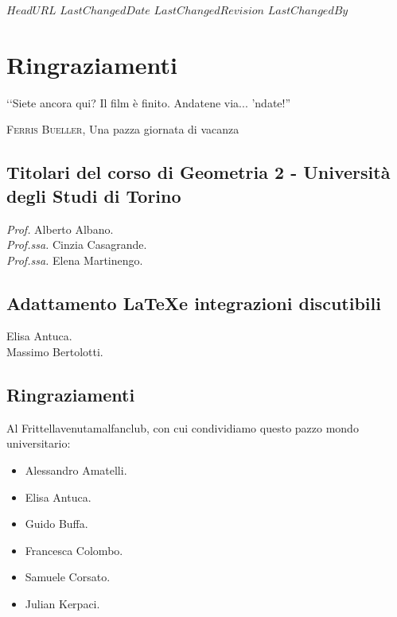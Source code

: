 \svnidlong
{$HeadURL$}
{$LastChangedDate$}
{$LastChangedRevision$}
{$LastChangedBy$}

\chapter{Ringraziamenti}

\begin{introduction}
  ‘‘Siete ancora qui? Il film è finito. Andatene via... 'ndate!''
	\begin{flushright}
		\textsc{Ferris Bueller,} Una pazza giornata di vacanza
	\end{flushright}
\end{introduction}

\section*{Titolari del corso di Geometria 2 - Università degli Studi di Torino}

\textit{Prof.} Alberto Albano.\\
\textit{Prof.ssa.} Cinzia Casagrande.\\
\textit{Prof.ssa.} Elena Martinengo.

\section*{Adattamento \LaTeX e integrazioni discutibili}
Elisa Antuca.\\
Massimo Bertolotti.

\section*{Ringraziamenti}
Al Frittellavenutamalfanclub, con cui condividiamo questo pazzo mondo universitario:
\begin{itemize}
	\item Alessandro Amatelli.
	\item Elisa Antuca.
	\item Guido Buffa.
	\item Francesca Colombo.
	\item Samuele Corsato.
	\item Julian Kerpaci.
\end{itemize}